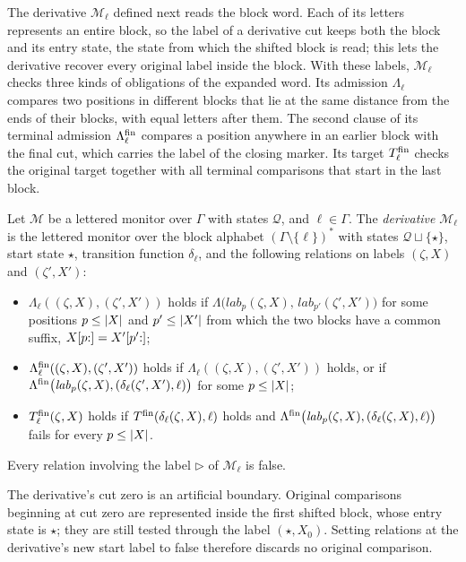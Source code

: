 The derivative $\mathcal M_\ell$ defined next reads the block word. Each of its
letters represents an entire block, so the label of a derivative cut keeps both
the block and its entry state, the state from which the shifted block is read;
this lets the derivative recover every original label inside the block. With
these labels, $\mathcal M_\ell$ checks three kinds of obligations of the expanded
word. Its admission $\Lambda_\ell$ compares two positions in different blocks
that lie at the same distance from the ends of their blocks, with equal letters
after them. The second clause of its terminal admission $\Lambda^{\mathrm{fin}}_\ell$ compares a
position anywhere in an earlier block with the final cut, which carries the label
of the closing marker. Its target $T^{\mathrm{fin}}_\ell$ checks the original target together
with all terminal comparisons that start in the last block.

\begin{definition}[Derivative]\label{def:derivative}
Let $\mathcal{M}$ be a lettered monitor over $\Gamma$ with states $\mathcal Q$, and $\ell \in \Gamma$.
The \emph{derivative} $\mathcal{M}_\ell$ is the lettered monitor over the block alphabet
$(\Gamma\setminus\{\ell\})^*$ with states $\mathcal Q \sqcup \{\star\}$, start state $\star$, transition
function $\delta_\ell$, and the following relations on labels $(\zeta,X)$ and $(\zeta',X')$:
\begin{itemize}[leftmargin=*]
\item $\Lambda_\ell((\zeta,X),(\zeta',X'))$ holds if
  $\Lambda\bigl(\mathit{lab}_{p}(\zeta,X),\, \mathit{lab}_{p'}(\zeta',X')\bigr)$ for some
  positions $p\le\lvert X\rvert$ and $p'\le\lvert X'\rvert$ from which the two blocks have a common
  suffix, $X[p{:}]=X'[p'{:}]$;
\item $\Lambda^{\mathrm{fin}}_\ell((\zeta,X),(\zeta',X'))$ holds if $\Lambda_\ell((\zeta,X),(\zeta',X'))$ holds, or if
  $\Lambda^{\mathrm{fin}}\bigl(\mathit{lab}_p(\zeta,X), (\delta_\ell(\zeta',X'),\ell)\bigr)$ for some
  $p \le \lvert X\rvert$;
\item $T^{\mathrm{fin}}_\ell(\zeta,X)$ holds if $T^{\mathrm{fin}}(\delta_\ell(\zeta,X),\ell)$ holds and
  $\Lambda^{\mathrm{fin}}\bigl(\mathit{lab}_p(\zeta,X), (\delta_\ell(\zeta,X),\ell)\bigr)$ fails for every
  $p \le \lvert X\rvert$.
\end{itemize}
Every relation involving the label $\triangleright$ of $\mathcal{M}_\ell$ is false.
\end{definition}

The derivative's cut zero is an artificial boundary. Original comparisons
beginning at cut zero are represented inside the first shifted block,
whose entry state is $\star$; they are still tested through the label
$(\star,X_0)$. Setting relations at the derivative's new start label to
false therefore discards no original comparison.

